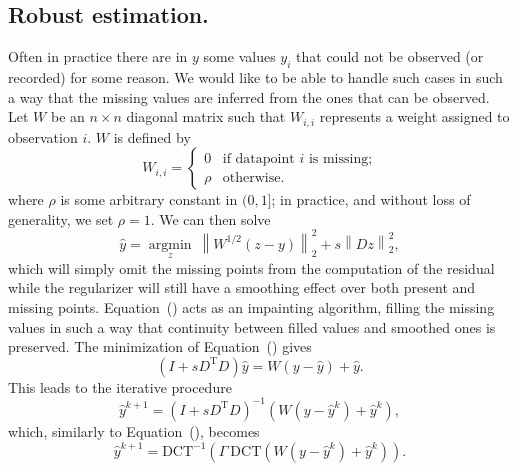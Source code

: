 \documentclass[preprint]{imsart}
\newcommand{\argmin}[1]{\underset{#1}{\operatorname{argmin}}\ }
\newcommand{\funct}[1]{\mathrm{#1}}
\newcommand{\transpose}[1]{#1^\mathrm{T}}
\newcommand{\norm}[2]{\left\| #1 \right\|_{#2}}
\begin{document}
\subsection{Robust estimation.}
\label{sec:robustL2}

Often in practice there are in $y$ some values $y_i$ that could not be observed (or recorded) for some reason.
We would like to be able to handle such cases in such a way that the missing values are inferred from the ones that can be observed.
Let $W$ be an $n \times n$ diagonal matrix such that $W_{i, i}$ represents a weight assigned to observation $i$. $W$ is defined by
\begin{equation}
    W_{i, i} = 
    \begin{cases}
        0 &\text{if datapoint $i$ is missing;} \\
        \rho &\text{otherwise.}
    \end{cases}
\end{equation}
where $\rho$ is some arbitrary constant in $(0, 1]$; in practice, and without loss of generality, we set $\rho=1$. We can then solve
\begin{equation}
    \hat{y} = \argmin{z} \norm{ W^{1/2} (z - y)}{2}^2 + s \norm{Dz}{2}^ 2 ,
    \label{eq:WLSformulation}
\end{equation}
which will simply omit the missing points from the computation of the residual while the regularizer will still have a smoothing effect over both present and missing points. Equation~() acts as an impainting algorithm, filling the missing values in such a way that continuity between filled values and smoothed ones is preserved.
The minimization of Equation~() gives
\begin{equation}
    (I + s \transpose{D}D) \hat{y} = W (y - \hat{y}) + \hat{y} .
\end{equation}
This leads to the iterative procedure
\begin{equation}
    \hat{y}^{k+1} = (I + s \transpose{D}D)^{-1} \left( W \left( y - \hat{y}^k  \right) + \hat{y}^k \right) ,
\end{equation}
which, similarly to Equation~(), becomes
\begin{equation}
    \hat{y}^{k+1} = \funct{DCT}^{-1} \left( \varGamma \ \funct{DCT} \left( W \left(y - \hat{y}^k \right) + \hat{y}^k \right) \right) .
    \label{eq:WLSsolutionDCT}
\end{equation}
\end{document}

